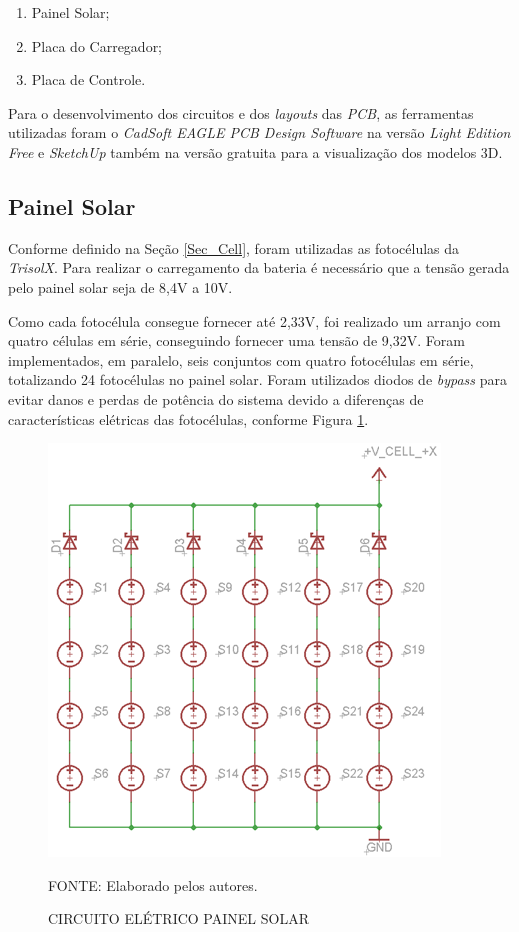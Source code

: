 \documentclass[
	12pt,				%
	openright,			%
	oneside,			%
	a4paper,			%
	english,			%
	french,				%
	spanish,			%
	brazil,				%
	oldfontcommands
	]{abntex2}
\begin{document}
	\begin{enumerate}
		\item Painel Solar;
		\item Placa do Carregador;
		\item Placa de Controle.
	\end{enumerate}

	Para o desenvolvimento dos circuitos e dos \textit{layouts} das \textit{PCB}, as ferramentas utilizadas foram o \textit{CadSoft EAGLE PCB Design Software} na versão \textit{Light Edition Free} e \textit{SketchUp} também na versão gratuita para a visualização dos modelos 3D.
	
\subsection[Painel Solar]{Painel Solar}

	Conforme definido na Seção \ref{Sec_Cell}, foram utilizadas as fotocélulas da \textit{TrisolX}. Para realizar o carregamento da bateria é necessário que a tensão gerada pelo painel solar seja de 8,4V a 10V. 
	
	Como cada fotocélula consegue fornecer até 2,33V, foi realizado um arranjo com quatro células em série, conseguindo fornecer uma tensão de 9,32V. Foram implementados, em paralelo, seis conjuntos com quatro fotocélulas em série, totalizando 24 fotocélulas no painel solar. Foram utilizados diodos de \textit{bypass} para evitar danos e perdas de potência do sistema devido a diferenças de características elétricas das fotocélulas, conforme Figura \ref{Fig_Circ_Cell}.
	
	\begin{figure}[th]
		\caption{CIRCUITO ELÉTRICO PAINEL SOLAR}
		\label{Fig_Circ_Cell}
		\centering
		\includegraphics[width=0.6\linewidth]{./figs/circ_cell}
			
		\begin{small}
			FONTE: Elaborado pelos autores.
		\end{small}
	\end{figure}
	\pagebreak
	
\end{document}
